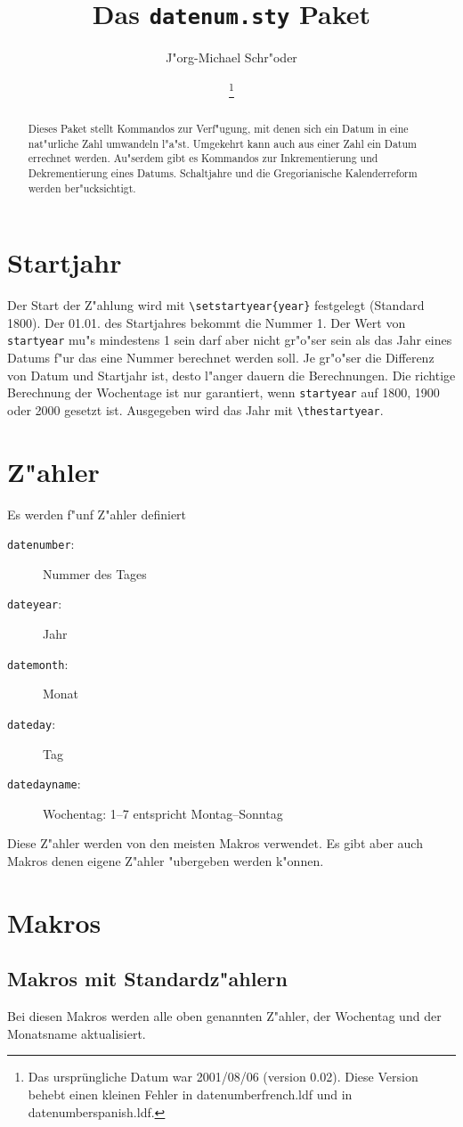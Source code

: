 \documentclass[a4paper,draft]{article}
\title{Das {\tt datenum.sty} Paket \fileversion}
\author{J"org-Michael Schr"oder\\%
}
\date{\filedate\footnote{Das ursprüngliche Datum war 2001/08/06 (version 0.02). Diese Version behebt einen kleinen Fehler in datenumberfrench.ldf und in datenumberspanish.ldf.}}
\begin{document}
\maketitle
\begin{abstract}
Dieses Paket stellt Kommandos zur Verf"ugung, mit denen sich ein Datum in eine nat"urliche Zahl umwandeln l"a"st. Umgekehrt kann auch aus einer Zahl ein Datum errechnet werden. Au"serdem gibt es Kommandos zur Inkrementierung und Dekrementierung eines Datums. Schaltjahre und die Gregorianische Kalenderreform werden ber"ucksichtigt.
\end{abstract}

\tableofcontents
\section{Startjahr}
Der Start der Z"ahlung wird mit \verb+\setstartyear{year}+ festgelegt (Standard 1800).
Der 01.01. des Startjahres bekommt die Nummer 1. Der Wert von \texttt{startyear} mu"s mindestens 1 sein darf aber nicht gr"o"ser sein als das Jahr eines Datums f"ur das eine Nummer berechnet werden soll. Je gr"o"ser die Differenz von Datum und Startjahr ist, desto l"anger dauern die Berechnungen. Die richtige Berechnung der Wochentage ist nur garantiert, wenn  \texttt{startyear} auf 1800, 1900 oder 2000 gesetzt ist. Ausgegeben wird das Jahr mit \verb+\thestartyear+.
\section{Z"ahler}
Es werden f"unf Z"ahler definiert
\begin{description}
\item[\texttt{datenumber}:] Nummer des Tages
\item[\texttt{dateyear}:] Jahr
\item[\texttt{datemonth}:] Monat
\item[\texttt{dateday}:] Tag
\item[\texttt{datedayname}:] Wochentag: 1--7 entspricht Montag--Sonntag
\end{description}
Diese Z"ahler werden von den meisten Makros verwendet. Es gibt aber auch Makros denen eigene Z"ahler "ubergeben werden k"onnen.
\section{Makros}
\subsection{Makros mit Standardz"ahlern\label{macro}}
Bei diesen Makros werden alle oben genannten Z"ahler, der Wochentag und der Monatsname aktualisiert.
\end{document}
